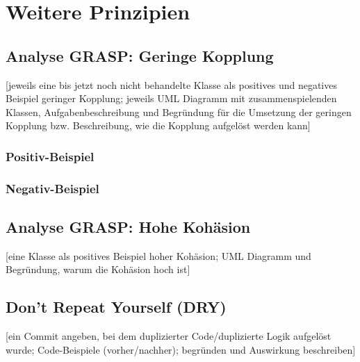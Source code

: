 \chapter{Weitere Prinzipien}

\section{Analyse GRASP: Geringe Kopplung}
[jeweils eine bis jetzt noch nicht behandelte Klasse als positives und negatives Beispiel geringer Kopplung; jeweils UML Diagramm mit zusammenspielenden Klassen, Aufgabenbeschreibung und Begründung für die Umsetzung der geringen Kopplung bzw. Beschreibung, wie die Kopplung aufgelöst werden kann]
\subsection{Positiv-Beispiel}
\subsection{Negativ-Beispiel}

\section{Analyse GRASP: Hohe Kohäsion}
[eine Klasse als positives Beispiel hoher Kohäsion; UML Diagramm und Begründung, warum die Kohäsion hoch ist]

\section{Don't Repeat Yourself (DRY)}
[ein Commit angeben, bei dem duplizierter Code/duplizierte Logik aufgelöst wurde; Code-Beispiele (vorher/nachher); begründen und Auswirkung beschreiben]